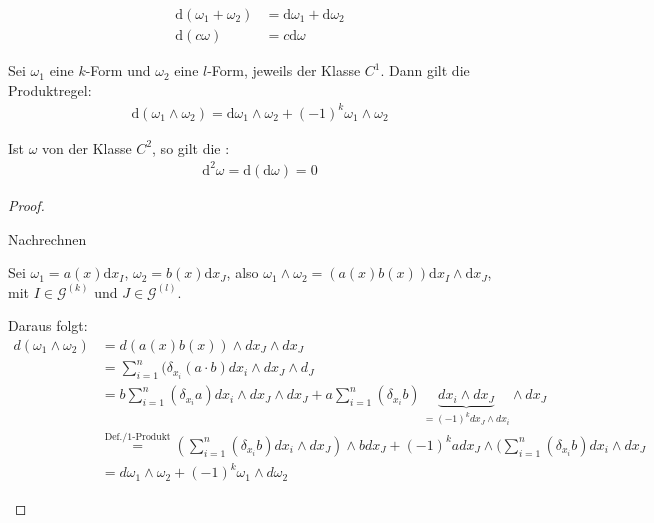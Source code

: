 \begin{theorem}[Satz] \label{thm:8.5}
  \begin{enum-arab}
  \item
    \begin{align*}
      \mathrm d(\omega_1 + \omega_2) &= \mathrm d \omega_1 + \mathrm d \omega_2 \\
      \mathrm d(c \omega) &= c \mathrm d \omega
    \end{align*}
  \item
    Sei $\omega_1$ eine $k$-Form und $\omega_2$ eine $l$-Form, jeweils der Klasse $C^1$.
    Dann gilt die Produktregel:
    \begin{align*}
      \mathrm d (\omega_1 \wedge \omega_2) = \mathrm d \omega_1 \wedge \omega_2 + (-1)^k \omega_1 \wedge \omega_2
    \end{align*}
  \item
    Ist $\omega$ von der Klasse $C^2$, so gilt die :
    \begin{align*}
      \mathrm d^2 \omega = \mathrm d(\mathrm d \omega) = 0
    \end{align*}
  \end{enum-arab}
  \begin{proof}
    \begin{enum-arab}
    \item
      Nachrechnen
    \item
      Sei $\omega_1 = a(x) \mathrm d x_I$, $\omega_2 = b(x) \mathrm d x_J$, also $\omega_1 \wedge \omega_2 = (a(x)b(x)) \mathrm d x_I \wedge \mathrm d x_J$, mit $I \in \mathcal G^{(k)}$ und $J \in \mathcal G^{(l)}$.
    \item
      Daraus folgt:
      \begin{align*}
        d(\omega_1 \land \omega_2)&=d(a(x) b(x))\wedge dx_J \wedge dx_J\\
        &= \sum_{i=1}^n(\delta_{x_i}(a\cdot b) dx_i \wedge dx_J \wedge d_J\\
        &= b\sum_{i=1}^n(\delta_{x_i} a) dx_i \wedge dx_J \wedge dx_J + a \sum_{i=1}^n (\delta_{x_i} b)\, \underbrace{dx_i \wedge dx_J}_{=(-1)^k dx_J \wedge dx_i}  \wedge dx_J \\
        &\stackrel{\text{Def./1-Produkt}}=(\sum_{i=1}^n(\delta_{x_i}b) dx_i \wedge dx_J)\wedge bdx_J + (-1)^k a dx_J \wedge(\sum_{i=1}^n(\delta_{x_i} b) dx_i \wedge dx_J \\
        &= d\omega_1 \wedge \omega_2+(-1)^k \omega_1 \wedge d\omega_2
      \end{align*}

\end{enum-arab}
\end{proof}
\end{theorem}

